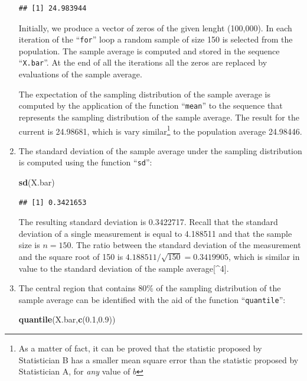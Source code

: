 \documentclass[]{krantz}
\makeatletter
\newenvironment{Shaded}{\begin{snugshade}}{\end{snugshade}}
\newcommand{\KeywordTok}[1]{\textcolor[rgb]{0.13,0.29,0.53}{\textbf{#1}}}
\newcommand{\FloatTok}[1]{\textcolor[rgb]{0.00,0.00,0.81}{#1}}
\newcommand{\NormalTok}[1]{#1}
\newenvironment{kframe}{%
\medskip{}
\setlength{\fboxsep}{.8em}
 \def\at@end@of@kframe{}%
 \ifinner\ifhmode%
  \def\at@end@of@kframe{\end{minipage}}%
  \begin{minipage}{\columnwidth}%
 \fi\fi%
 \def\FrameCommand##1{\hskip\@totalleftmargin \hskip-\fboxsep
 \colorbox{shadecolor}{##1}\hskip-\fboxsep
     \hskip-\linewidth \hskip-\@totalleftmargin \hskip\columnwidth}%
 \MakeFramed {\advance\hsize-\width
   \@totalleftmargin\z@ \linewidth\hsize
   \@setminipage}}%
 {\par\unskip\endMakeFramed%
 \at@end@of@kframe}
\renewenvironment{Shaded}{\begin{kframe}}{\end{kframe}}
\theoremstyle{definition}
\theoremstyle{definition}
\theoremstyle{definition}
\theoremstyle{remark}
\makeatother
\begin{document}
\begin{enumerate}
\begin{verbatim}
## [1] 24.983944
\end{verbatim}

  Initially, we produce a vector of zeros of the given lenght (100,000).
  In each iteration of the ``\texttt{for}'' loop a random sample of size
  150 is selected from the population. The sample average is computed
  and stored in the sequence ``\texttt{X.bar}''. At the end of all the
  iterations all the zeros are replaced by evaluations of the sample
  average.

  The expectation of the sampling distribution of the sample average is
  computed by the application of the function ``\texttt{mean}'' to the
  sequence that represents the sampling distribution of the sample
  average. The result for the current is 24.98681, which is vary
  similar\footnote{As a matter of fact, it can be proved that the
    statistic proposed by Statistician B has a smaller mean square error
    than the statistic proposed by Statistician A, for \emph{any} value
    of \(b\)} to the population average 24.98446.
\item
  The standard deviation of the sample average under the sampling
  distribution is computed using the function ``\texttt{sd}'':

\begin{Shaded}
\begin{Highlighting}[]
\KeywordTok{sd}\NormalTok{(X.bar)}
\end{Highlighting}
\end{Shaded}

\begin{verbatim}
## [1] 0.3421653
\end{verbatim}

  The resulting standard deviation is 0.3422717. Recall that the
  standard deviation of a single measurement is equal to 4.188511 and
  that the sample size is \(n=150\). The ratio between the standard
  deviation of the measurement and the square root of 150 is
  \(4.188511/\sqrt{150} =0.3419905\), which is similar in value to the
  standard deviation of the sample average{[}\^{}4{]}.
\item
  The central region that contains 80\% of the sampling distribution of
  the sample average can be identified with the aid of the function
  ``\texttt{quantile}'':

\begin{Shaded}
\begin{Highlighting}[]
\KeywordTok{quantile}\NormalTok{(X.bar,}\KeywordTok{c}\NormalTok{(}\FloatTok{0.1}\NormalTok{,}\FloatTok{0.9}\NormalTok{))}
\end{Highlighting}
\end{Shaded}


\end{enumerate}
\end{document}
